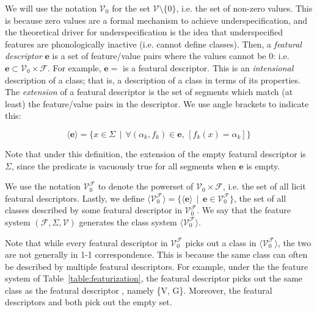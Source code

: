 \documentclass[11pt, oneside]{article}   	%
\begin{document}
\noindent We will use the notation $\mathcal V_0$ for the set $\mathcal V \setminus \{0\}$, i.e. the set of non-zero values. This is because zero values are a formal mechanism to achieve underspecification, and the theoretical driver for underspecification is the idea that underspecified features are phonologically inactive (i.e. cannot define classes). Then, a \textit{featural descriptor} $\mathbf{e}$ is a set of feature/value pairs where the values cannot be $0$: i.e. $\mathbf{e} \subset \mathcal V_0 \times \mathcal F$. For example, $\mathbf{e} =$   is a featural descriptor. This is an \textit{intensional} description of a class; that is, a description of a class in terms of its properties. The \textit{extension} of a featural descriptor is the set of segments which match (at least) the feature/value pairs in the descriptor. We use angle brackets to indicate this:

$$ \big \langle \mathbf{e} \big \rangle = \{x \in \Sigma \, \mid \, \forall (\alpha_k, f_k) \in \mathbf{e} \text{,  } [ f_k(x) = \alpha_k ] \} $$

\vspace{\baselineskip} \noindent Note that under this definition, the extension of the empty featural descriptor is $\Sigma$, since the predicate is vacuously true for all segments when $\mathbf{e}$ is empty. 

We use the notation $\mathcal V_0^\mathcal F$ to denote the powerset of $\mathcal V_0 \times \mathcal F$, i.e. the set of all licit featural descriptors. Lastly, we define $\langle \mathcal V_0^\mathcal F \rangle = \{ \langle \mathbf{e} \rangle \, \mid \, \mathbf{e} \in \mathcal V_0^\mathcal F \}$, the set of all classes described by some featural descriptor in $\mathcal V_0^\mathcal F$. We say that the feature system $(\mathcal F, \Sigma, \mathcal V)$ generates the class system $\langle \mathcal V_0^\mathcal F \rangle$.

Note that while every featural descriptor in $\mathcal V_0^\mathcal F$ picks out a class in $\langle \mathcal V_0^\mathcal F \rangle$, the two are not generally in 1-1 correspondence. This is because the same class can often be described by multiple featural descriptors. For example, under the the feature system of Table~\ref{table:featurization}, the featural descriptor  picks out the same class as the featural descriptor , namely \{V, G\}. Moreover, the featural descriptors  and  both pick out the empty set.
\end{document}
